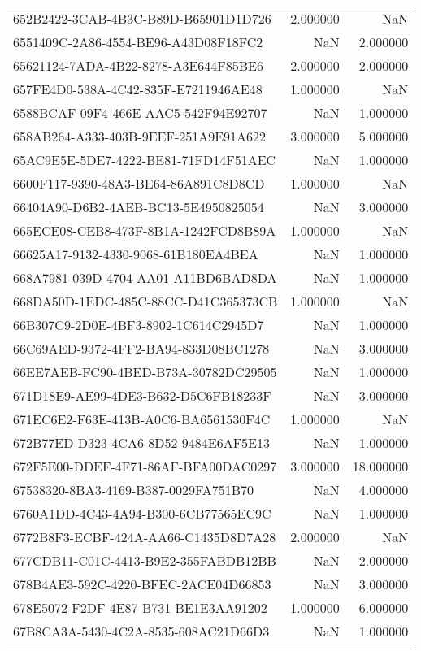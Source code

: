 \begin{tabular}{lrr}
652B2422-3CAB-4B3C-B89D-B65901D1D726 & 2.000000 & NaN \\
6551409C-2A86-4554-BE96-A43D08F18FC2 & NaN & 2.000000 \\
65621124-7ADA-4B22-8278-A3E644F85BE6 & 2.000000 & 2.000000 \\
657FE4D0-538A-4C42-835F-E7211946AE48 & 1.000000 & NaN \\
6588BCAF-09F4-466E-AAC5-542F94E92707 & NaN & 1.000000 \\
658AB264-A333-403B-9EEF-251A9E91A622 & 3.000000 & 5.000000 \\
65AC9E5E-5DE7-4222-BE81-71FD14F51AEC & NaN & 1.000000 \\
6600F117-9390-48A3-BE64-86A891C8D8CD & 1.000000 & NaN \\
66404A90-D6B2-4AEB-BC13-5E4950825054 & NaN & 3.000000 \\
665ECE08-CEB8-473F-8B1A-1242FCD8B89A & 1.000000 & NaN \\
66625A17-9132-4330-9068-61B180EA4BEA & NaN & 1.000000 \\
668A7981-039D-4704-AA01-A11BD6BAD8DA & NaN & 1.000000 \\
668DA50D-1EDC-485C-88CC-D41C365373CB & 1.000000 & NaN \\
66B307C9-2D0E-4BF3-8902-1C614C2945D7 & NaN & 1.000000 \\
66C69AED-9372-4FF2-BA94-833D08BC1278 & NaN & 3.000000 \\
66EE7AEB-FC90-4BED-B73A-30782DC29505 & NaN & 1.000000 \\
671D18E9-AE99-4DE3-B632-D5C6FB18233F & NaN & 3.000000 \\
671EC6E2-F63E-413B-A0C6-BA6561530F4C & 1.000000 & NaN \\
672B77ED-D323-4CA6-8D52-9484E6AF5E13 & NaN & 1.000000 \\
672F5E00-DDEF-4F71-86AF-BFA00DAC0297 & 3.000000 & 18.000000 \\
67538320-8BA3-4169-B387-0029FA751B70 & NaN & 4.000000 \\
6760A1DD-4C43-4A94-B300-6CB77565EC9C & NaN & 1.000000 \\
6772B8F3-ECBF-424A-AA66-C1435D8D7A28 & 2.000000 & NaN \\
677CDB11-C01C-4413-B9E2-355FABDB12BB & NaN & 2.000000 \\
678B4AE3-592C-4220-BFEC-2ACE04D66853 & NaN & 3.000000 \\
678E5072-F2DF-4E87-B731-BE1E3AA91202 & 1.000000 & 6.000000 \\
67B8CA3A-5430-4C2A-8535-608AC21D66D3 & NaN & 1.000000 \\

\end{tabular}
